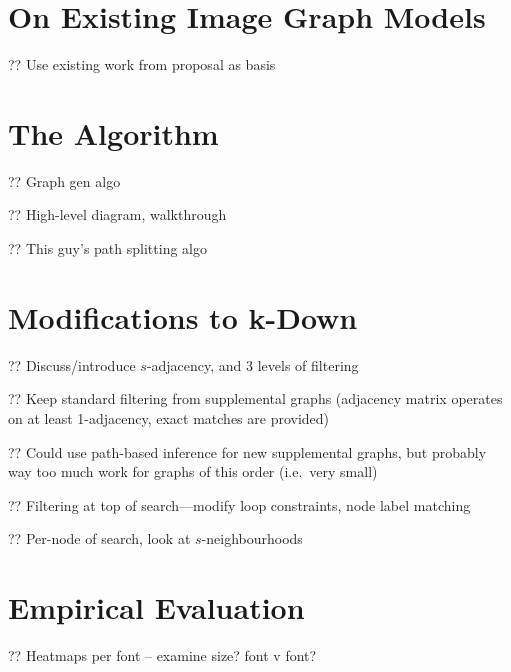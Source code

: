 \documentclass{mpaper}
\begin{document}
\section{On Existing Image Graph Models}
\label{sec:image-weakness}

\citeauthor{Plane-Graphs-From-Images} \cite{Plane-Graphs-From-Images}

?? Use existing work from proposal as basis

\section{The Algorithm}
\label{sec:algorithm}

?? Graph gen algo

?? High-level diagram, walkthrough

?? This guy's path splitting algo \cite{PathCurvature}

\section{Modifications to k-Down}
\label{sec:k-down-mods}

?? Discuss/introduce $s$-adjacency, and 3 levels of filtering

?? Keep standard filtering from supplemental graphs (adjacency matrix operates on at least 1-adjacency, exact matches are provided)

?? Could use path-based inference for new supplemental graphs, but probably way too much work for graphs of this order (i.e.\ very small)

?? Filtering at top of search---modify loop constraints, node label matching

?? Per-node of search, look at $s$-neighbourhoods

\section{Empirical Evaluation}
\label{sec:evaluation}

?? Heatmaps per font -- examine size? font v font?
\end{document}
